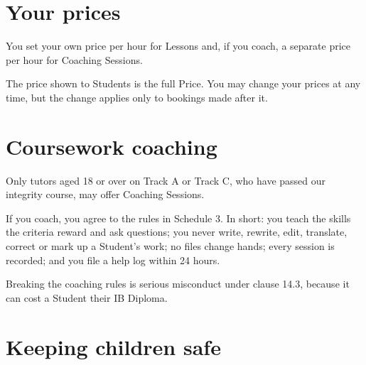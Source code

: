\documentclass[11pt]{article}
\begin{document}
\section{Your prices}

\begin{clauses}
  \item You set your own price per hour for Lessons and, if you coach, a separate price per hour for Coaching Sessions.
  \item The price shown to Students is the full Price. You may change your prices at any time, but the change applies only to bookings made after it.
\end{clauses}

\section{Coursework coaching}

\begin{clauses}
  \item Only tutors aged 18 or over on Track A or Track C, who have passed our integrity course, may offer Coaching Sessions.
  \item If you coach, you agree to the rules in Schedule 3. In short: you teach the skills the criteria reward and ask questions; you never write, rewrite, edit, translate, correct or mark up a Student's work; no files change hands; every session is recorded; and you file a help log within 24 hours.
  \item Breaking the coaching rules is serious misconduct under clause 14.3, because it can cost a Student their IB Diploma.
\end{clauses}

\section{Keeping children safe}
\end{document}
